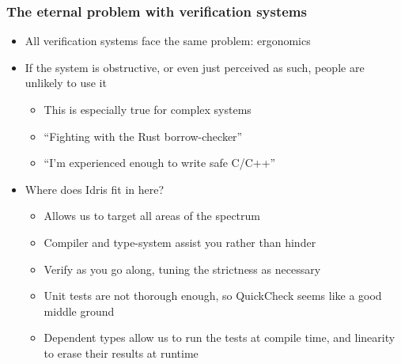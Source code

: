 \documentclass[compress,handout]{beamer}
\begin{document}
\begin{frame}
  \frametitle{The eternal problem with verification systems}

  \begin{itemize}
    \item<1-> All verification systems face the same problem: ergonomics
    \item<2-> If the system is obstructive, or even just perceived as such,
              people are unlikely to use it
    \begin{itemize}
      \item This is especially true for complex systems
      \item ``Fighting with the Rust borrow-checker''
      \item ``I'm experienced enough to write safe C/C++''
    \end{itemize}
    \item<3-> Where does Idris fit in here?
      \begin{itemize}
        \item<4-> Allows us to target all areas of the spectrum
        \item<5-> Compiler and type-system assist you rather than hinder
        \item<6-> Verify as you go along, tuning the strictness as necessary
        \item<7-> Unit tests are not thorough enough, so QuickCheck seems like a
                  good middle ground
        \item<8-> Dependent types allow us to run the tests at compile time, and
                  linearity to erase their results at runtime
      \end{itemize}
  \end{itemize}

  \vspace*{-5mm}

\end{frame}
\end{document}
